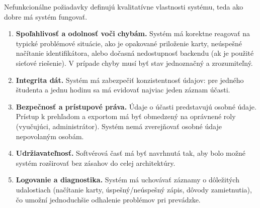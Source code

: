 Nefunkcionálne požiadavky definujú kvalitatívne vlastnosti systému, teda ako dobre má systém fungovať.

\begin{enumerate}
    \item \textbf{Spoľahlivosť a odolnosť voči chybám.}  
    Systém má korektne reagovať na typické problémové situácie, ako je opakované priloženie karty, neúspešné načítanie identifikátora, alebo dočasná nedostupnosť backendu (ak je použité sieťové riešenie). V prípade chyby musí byť stav jednoznačný a zrozumiteľný.

    \item \textbf{Integrita dát.}  
    Systém má zabezpečiť konzistentnosť údajov: pre jedného študenta a jednu hodinu sa má evidovať najviac jeden záznam účasti.

    \item \textbf{Bezpečnosť a prístupové práva.}  
    Údaje o účasti predstavujú osobné údaje. Prístup k prehľadom a exportom má byť obmedzený na oprávnené roly (vyučujúci, administrátor). Systém nemá zverejňovať osobné údaje nepovolaným osobám.

    \item \textbf{Udržiavateľnosť.}  
    Softvérová časť má byť navrhnutá tak, aby bolo možné systém rozširovať bez zásahov do celej architektúry.

    \item \textbf{Logovanie a diagnostika.}  
    Systém má uchovávať záznamy o dôležitých udalostiach (načítanie karty, úspešný/neúspešný zápis, dôvody zamietnutia), čo umožní jednoduchšie odhalenie problémov pri prevádzke.
\end{enumerate}

